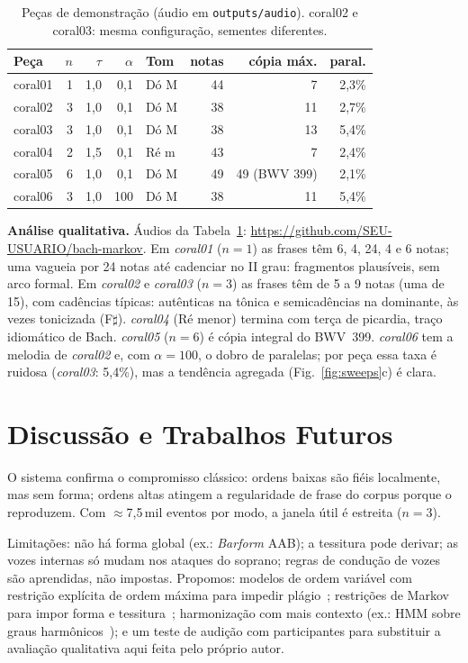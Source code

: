 \documentclass{article}
\begin{document}
\begin{table}[t]
\centering\small
\setlength{\tabcolsep}{3pt}
\begin{tabular}{@{}lrrrlrrr@{}}
\toprule
Peça & $n$ & $\tau$ & $\alpha$ & Tom & notas & cópia máx. & paral. \\
\midrule
coral01 & 1 & 1{,}0 & 0{,}1 & Dó M & 44 & 7 & 2{,}3\% \\
coral02 & 3 & 1{,}0 & 0{,}1 & Dó M & 38 & 11 & 2{,}7\% \\
coral03 & 3 & 1{,}0 & 0{,}1 & Dó M & 38 & 13 & 5{,}4\% \\
coral04 & 2 & 1{,}5 & 0{,}1 & Ré m & 43 & 7 & 2{,}4\% \\
coral05 & 6 & 1{,}0 & 0{,}1 & Dó M & 49 & 49 (BWV 399) & 2{,}1\% \\
coral06 & 3 & 1{,}0 & 100 & Dó M & 38 & 11 & 5{,}4\% \\
\bottomrule
\end{tabular}
\caption{Peças de demonstração (áudio em \texttt{outputs/audio}). coral02 e coral03: mesma configuração, sementes diferentes.}
\label{tab:pieces}
\end{table}

\textbf{Análise qualitativa.} Áudios da Tabela~\ref{tab:pieces}: \url{https://github.com/SEU-USUARIO/bach-markov}. Em \textit{coral01} ($n=1$) as frases têm 6, 4, 24, 4 e 6 notas; uma vagueia por 24 notas até cadenciar no II grau: fragmentos plausíveis, sem arco formal. Em \textit{coral02} e \textit{coral03} ($n=3$) as frases têm de 5 a 9 notas (uma de 15), com cadências típicas: autênticas na tônica e semicadências na dominante, às vezes tonicizada (F$\sharp$). \textit{coral04} (Ré menor) termina com terça de picardia, traço idiomático de Bach. \textit{coral05} ($n=6$) é cópia integral do BWV~399. \textit{coral06} tem a melodia de \textit{coral02} e, com $\alpha=100$, o dobro de paralelas; por peça essa taxa é ruidosa (\textit{coral03}: 5{,}4\%), mas a tendência agregada (Fig.~\ref{fig:sweeps}c) é clara.

\section{Discussão e Trabalhos Futuros}\label{sec:discussion}
O sistema confirma o compromisso clássico: ordens baixas são fiéis localmente, mas sem forma; ordens altas atingem a regularidade de frase do corpus porque o reproduzem. Com $\approx$7{,}5\,mil eventos por modo, a janela útil é estreita ($n=3$).

Limitações: não há forma global (ex.: \textit{Barform} AAB); a tessitura pode derivar; as vozes internas só mudam nos ataques do soprano; regras de condução de vozes são aprendidas, não impostas. Propomos: modelos de ordem variável com restrição explícita de ordem máxima para impedir plágio~\cite{papadopoulos2014}; restrições de Markov para impor forma e tessitura~\cite{pachet2011}; harmonização com mais contexto (ex.: HMM sobre graus harmônicos~\cite{allan2005}); e um teste de audição com participantes para substituir a avaliação qualitativa aqui feita pelo próprio autor.


\end{document}
